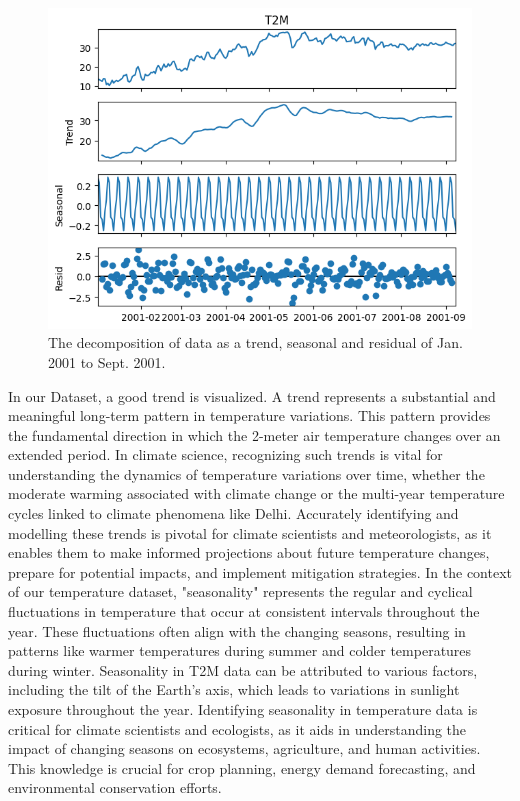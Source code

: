 \documentclass[sn-mathphys,Numbered]{sn-jnl}
\theoremstyle{thmstyleone}
\theoremstyle{thmstyletwo}
\theoremstyle{thmstylethree}
\begin{document}
\begin{figure}[ht!]
\centering
\includegraphics[width=1\textwidth, height=0.75\linewidth]{Graphycal_EDA.png}
\caption{The decomposition of data as a trend, seasonal and residual of Jan. 2001 to Sept. 2001. }
\label{fig:graphycalEDA}
\end{figure}
In our Dataset, a good trend is visualized. A trend represents a substantial and meaningful long-term pattern in temperature variations. This pattern provides the fundamental direction in which the 2-meter air temperature changes over an extended period. In climate science, recognizing such trends is vital for understanding the dynamics of temperature variations over time, whether the moderate warming associated with climate change or the multi-year temperature cycles linked to climate phenomena like Delhi. Accurately identifying and modelling these trends is pivotal for climate scientists and meteorologists, as it enables them to make informed projections about future temperature changes, prepare for potential impacts, and implement mitigation strategies.
In the context of our temperature dataset, "seasonality" represents the regular and cyclical fluctuations in temperature that occur at consistent intervals throughout the year. These fluctuations often align with the changing seasons, resulting in patterns like warmer temperatures during summer and colder temperatures during winter. Seasonality in T2M data can be attributed to various factors, including the tilt of the Earth's axis, which leads to variations in sunlight exposure throughout the year. Identifying seasonality in temperature data is critical for climate scientists and ecologists, as it aids in understanding the impact of changing seasons on ecosystems, agriculture, and human activities. This knowledge is crucial for crop planning, energy demand forecasting, and environmental conservation efforts.
\end{document}
